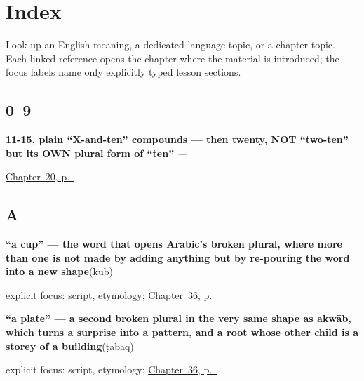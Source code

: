 
\chapter*{Index}

Look up an English meaning, a dedicated language topic, or a chapter topic. Each linked reference opens the chapter where the material is introduced; the focus labels name only explicitly typed lesson sections.

\section*{0--9}

\noindent\begin{minipage}[t]{\linewidth}
\raggedright
\textbf{11-15, plain \textquotedblleft{}X-and-ten\textquotedblright{} compounds — then twenty, NOT \textquotedblleft{}two-ten\textquotedblright{} but its OWN plural form of \textquotedblleft{}ten\textquotedblright{}}\enspace\emph{  — }\par
\footnotesize \hyperref[ch:ar-numbers-eleven-to-twenty]{Chapter~20, p.~\pageref*{ch:ar-numbers-eleven-to-twenty}}
\end{minipage}\par\smallskip

\section*{A}

\noindent\begin{minipage}[t]{\linewidth}
\raggedright
\textbf{\textquotedblleft{}a cup\textquotedblright{} — the word that opens Arabic's broken plural, where more than one is not made by adding anything but by re-pouring the word into a new shape}\enspace\emph{}\enspace(kūb)\par
\footnotesize explicit focus: script, etymology; \hyperref[ch:ar-cups-plates-and-more-than-one]{Chapter~36, p.~\pageref*{ch:ar-cups-plates-and-more-than-one}}
\end{minipage}\par\smallskip

\noindent\begin{minipage}[t]{\linewidth}
\raggedright
\textbf{\textquotedblleft{}a plate\textquotedblright{} — a second broken plural in the very same shape as akwāb, which turns a surprise into a pattern, and a root whose other child is a storey of a building}\enspace\emph{}\enspace(ṭabaq)\par
\footnotesize explicit focus: script, etymology; \hyperref[ch:ar-cups-plates-and-more-than-one]{Chapter~36, p.~\pageref*{ch:ar-cups-plates-and-more-than-one}}
\end{minipage}\par\smallskip

